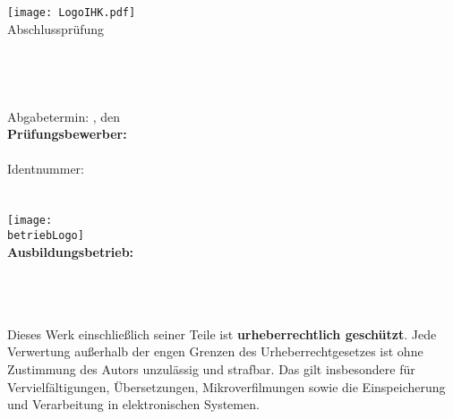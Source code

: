\begin{titlepage}

\begin{center}
\texttt{[image: LogoIHK.pdf]}\\[1ex]
\Large{Abschlussprüfung \pruefungstermin}\\[3ex]

\Large{\ausbildungsberuf}\\[1ex]
\LARGE{\betreff}\\[4ex]

\huge{\textbf{\titel}}\\[1.5ex]
\Large{\textbf{\untertitel}}\\[4ex]

\normalsize
Abgabetermin: \abgabeOrt, den \abgabeTermin\\[3em]
\textbf{Prüfungsbewerber:}\\
\autorName\\
Identnummer: \autorId\\
\autorAnschrift\\
\autorOrt\\[5ex]

\texttt{[image: \\betriebLogo]}\\[2ex]
\textbf{Ausbildungsbetrieb:}\\
\betriebName\\
\betriebAnschrift\\
\betriebOrt\\[5em]
\end{center}

\small
\noindent
Dieses Werk einschließlich seiner Teile ist \textbf{urheberrechtlich geschützt}.
Jede Verwertung außerhalb der engen Grenzen des Urheberrechtgesetzes ist ohne
Zustimmung des Autors unzulässig und strafbar. Das gilt insbesondere für
Vervielfältigungen, Übersetzungen, Mikroverfilmungen sowie die Einspeicherung
und Verarbeitung in elektronischen Systemen.

\end{titlepage}